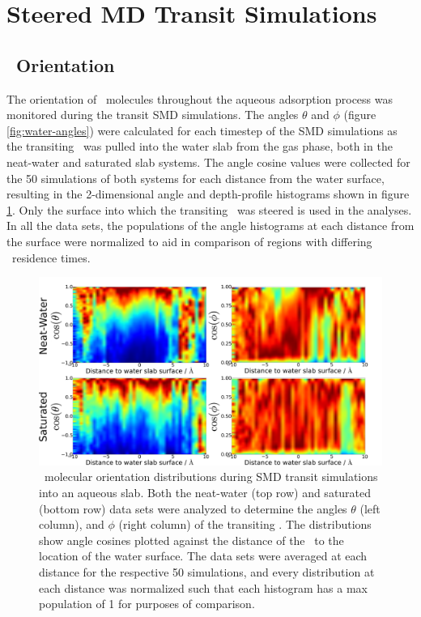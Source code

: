 \section{Steered MD Transit Simulations}

\subsection {\suldiox~Orientation}

	The orientation of \suldiox~molecules throughout the aqueous adsorption process was monitored during the transit SMD simulations. The angles $\theta$ and $\phi$ (figure \ref{fig:water-angles}) were calculated for each timestep of the SMD simulations as the transiting \suldiox~was pulled into the water slab from the gas phase, both in the neat-water and saturated slab systems. The angle cosine values were collected for the 50 simulations of both systems for each distance from the water surface, resulting in the 2-dimensional angle and depth-profile histograms shown in figure \ref{fig:so2-transit-angles}. Only the surface into which the transiting \suldiox~was steered is used in the analyses. In all the data sets, the populations of the angle histograms at each distance from the surface were normalized to aid in comparison of regions with differing \suldiox~residence times.

\begin{figure}[h!]
	\begin{center}
		\includegraphics[scale=1.0]{images/transit-so2-angles/so2-angles-transit.png}
		\caption{\suldiox~molecular orientation distributions during SMD transit simulations into an aqueous slab. Both the neat-water (top row) and saturated (bottom row) data sets were analyzed to determine the angles $\theta$ (left column), and $\phi$ (right column) of the transiting \suldiox. The distributions show angle cosines plotted against the distance of the \suldiox~to the location of the water surface. The data sets were averaged at each distance for the respective 50 simulations, and every distribution at each distance was normalized such that each histogram has a max population of 1 for purposes of comparison.}
		\label{fig:so2-transit-angles}
	\end{center}
\end{figure}

